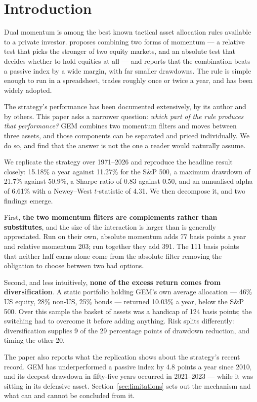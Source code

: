 \documentclass[11pt,a4paper]{article}
\let\oldsection\section
\renewcommand{\section}{\FloatBarrier\oldsection}
\begin{document}
\section{Introduction}

Dual momentum is among the best known tactical asset allocation rules available
to a private investor. \citet{antonacci2016} proposes combining two forms of
momentum --- a relative test that picks the stronger of two equity markets, and
an absolute test that decides whether to hold equities at all --- and reports
that the combination beats a passive index by a wide margin, with far smaller
drawdowns. The rule is simple enough to run in a spreadsheet, trades roughly
once or twice a year, and has been widely adopted.

The strategy's performance has been documented extensively, by its author and
by others. This paper asks a narrower question: \emph{which part of the rule
produces that performance?} GEM combines two momentum filters and moves between
three assets, and those components can be separated and priced individually. We
do so, and find that the answer is not the one a reader would naturally assume.

We replicate the strategy over 1971--2026 and reproduce the headline result
closely: 15.18\% a year against 11.27\% for the S\&P 500, a maximum drawdown of
21.7\% against 50.9\%, a Sharpe ratio of 0.83 against 0.50, and an annualised
alpha of 6.61\% with a Newey--West $t$-statistic of 4.31. We then decompose it,
and two findings emerge.

First, \textbf{the two momentum filters are complements rather than
substitutes}, and the size of the interaction is larger than is generally
appreciated. Run on their own, absolute momentum adds 77 basis points a year
and relative momentum 203; run together they add 391. The 111 basis points that
neither half earns alone come from the absolute filter removing the obligation
to choose between two bad options.

Second, and less intuitively, \textbf{none of the excess return comes from
diversification}. A static portfolio holding GEM's own average allocation ---
46\% US equity, 28\% non-US, 25\% bonds --- returned 10.03\% a year, below the
S\&P 500. Over this sample the basket of assets was a handicap of 124 basis
points; the switching had to overcome it before adding anything. Risk splits
differently: diversification supplies 9 of the 29 percentage points of drawdown
reduction, and timing the other 20.

The paper also reports what the replication shows about the strategy's recent
record. GEM has underperformed a passive index by 4.8 points a year since 2010,
and its deepest drawdown in fifty-five years occurred in 2021--2023 --- while
it was sitting in its defensive asset. Section~\ref{sec:limitations} sets out
the mechanism and what can and cannot be concluded from it.
\end{document}
